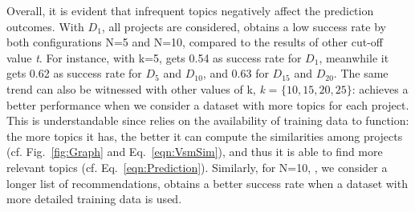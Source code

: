 
Overall, it is evident that infrequent topics negatively affect the prediction outcomes. With $D_{1}$, \ie all projects are considered, \TF obtains a low success rate by both configurations N=5 and N=10, compared to the results of other cut-off value \emph{t}. For instance, with k=5, \TFa gets 0.54 as success rate for $D_{1}$, meanwhile it gets 0.62 as success rate for $D_{5}$ and $D_{10}$, and 0.63 for $D_{15}$ and $D_{20}$. The same trend can also be witnessed with other values of k, \ie \emph{k} = $\{10, 15, 20, 25\}$: \TFa achieves a better performance when we consider a dataset with more topics for each project. This is understandable since \TFa relies on the availability of training data to function: the more topics it has, the better it can compute the similarities among projects (cf. Fig.~\ref{fig:Graph} and Eq.~\ref{eqn:VsmSim}), and thus it is able to find more relevant topics (cf. Eq.~\ref{eqn:Prediction}). Similarly, for N=10, \ie, we consider a longer list of recommendations, \TFa obtains a better success rate when a dataset with more detailed training data is used. 

